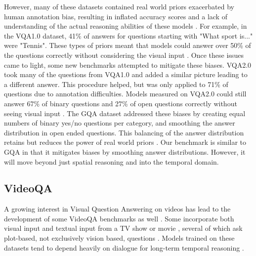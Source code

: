 \documentclass[10pt,twocolumn,letterpaper]{article}
\newcommand{\mgm}[1]{{\color{cyan}{mgm: #1}}}
\begin{document}
However, many of these datasets contained real world priors exacerbated by human annotation bias, resulting in inflated accuracy scores and a lack of understanding of the actual reasoning abilities of these models \cite{goyal2017making, hudson2019gqa}. For example, in the VQA1.0 dataset, 41\% of answers  for questions starting with "What sport is..." were "Tennis". These types of priors meant that models could answer over 50\% of the questions correctly without considering the visual input \cite{goyal2017making}. Once these issues came to light, some new benchmarks attempted to mitigate these biases. VQA2.0 took many of the questions from VQA1.0 and added a similar picture leading to a different answer. This procedure helped, but was only applied to 71\% of questions due to annotation difficulties. Models measured on VQA2.0 could still answer 67\% of binary questions and 27\% of open questions correctly without seeing visual input \cite{hudson2019gqa}. The GQA dataset addressed these biases by creating equal numbers of binary yes/no questions per category, and smoothing the answer distribution in open ended questions. This balancing of the answer distribution retains but reduces the power of real world priors \cite{hudson2019gqa}. Our benchmark is similar to GQA in that it mitigates biases by smoothing answer distributions. However, it will move beyond just spatial reasoning and into the temporal domain. 

\subsection{VideoQA}

\mgm{how to include new information here without being too repetitive with the introduction?}

A growing interest in Visual Question Answering on videos has lead to the development of some VideoQA benchmarks as well \cite{tapaswi2016movieqa, lei2018tvqa, jang2017tgif, kim2017deepstory, xu2017video, maharaj2017dataset, zeng2016leveraging, yu2019activitynet}. Some incorporate both visual input and textual input from a TV show or movie \cite{tapaswi2016movieqa, lei2018tvqa, kim2017deepstory}, several of which ask plot-based, not exclusively vision based, questions \cite{tapaswi2016movieqa, kim2017deepstory}. Models trained on these datasets tend to depend heavily on dialogue for long-term temporal reasoning \cite{tapaswi2016movieqa, lei2018tvqa}. 
\end{document}
